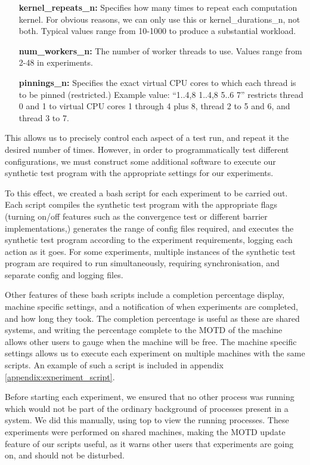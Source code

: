 \begin{itemize}
    \item[\textbf{kernel\_repeats\_n:}]   Specifies how many times to repeat each computation kernel. For obvious reasons, we can only use this or kernel\_durations\_n, not both. Typical values range from 10-1000 to produce a substantial workload.
    
    \item[\textbf{num\_workers\_n:}]      The number of worker threads to use. Values range from 2-48 in experiments.
    
    \item[\textbf{pinnings\_n:}]          Specifies the exact virtual CPU cores to which each thread is to be pinned (restricted.)  Example value: ``1..4,8 1..4,8 5..6 7'' restricts thread 0 and 1 to virtual CPU cores 1 through 4 plus 8, thread 2 to 5 and 6, and thread 3 to 7.
\end{itemize}

This allows us to precisely control each aspect of a test run, and repeat it the desired number of times. However, in order to programmatically test different configurations, we must construct some additional software to execute our synthetic test program with the appropriate settings for our experiments.

To this effect, we created a bash script for each experiment to be carried out. Each script compiles the synthetic test program with the appropriate flags (turning on/off features such as the convergence test or different barrier implementations,) generates the range of config files required, and executes the synthetic test program according to the experiment requirements, logging each action as it goes. For some experiments, multiple instances of the synthetic test program are required to run simultaneously, requiring synchronisation, and separate config and logging files.

Other features of these bash scripts include a completion percentage display, machine specific settings, and a notification of when experiments are completed, and how long they took. The completion percentage is useful as these are shared systems, and writing the percentage complete to the MOTD of the machine allows other users to gauge when the machine will be free. The machine specific settings allows us to execute each experiment on multiple machines with the same scripts. An example of such a script is included in appendix \ref{appendix:experiment_script}.

Before starting each experiment, we ensured that no other process was running which would not be part of the ordinary background of processes present in a system. We did this manually, using top to view the running processes. These experiments were performed on shared machines, making the MOTD update feature of our scripts useful, as it warns other users that experiments are going on, and should not be disturbed.



